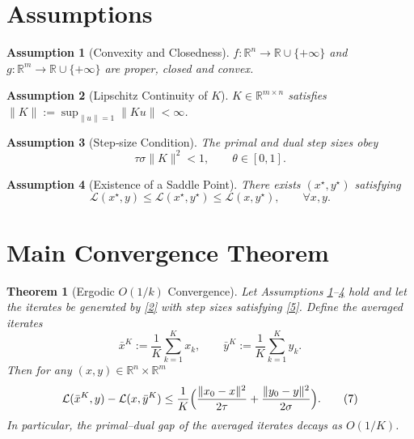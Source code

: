 \documentclass{article}
\newtheorem{theorem}{Theorem}
\newtheorem{assumption}{Assumption}
\newcommand{\norm}[1]{\|#1\|}
\begin{document}
\section*{Assumptions}
\begin{assumption}[Convexity and Closedness]\label{ass:convex}
$f:\mathbb{R}^{n}\to\mathbb{R}\cup\{+\infty\}$ and $g:\mathbb{R}^{m}\to\mathbb{R}\cup\{+\infty\}$ are proper, closed and convex.
\end{assumption}
\begin{assumption}[Lipschitz Continuity of $K$]\label{ass:K}
$K\in\mathbb{R}^{m\times n}$ satisfies $\|K\|:=\sup_{\|u\|=1}\|Ku\|<\infty$.
\end{assumption}
\begin{assumption}[Step‑size Condition]\label{ass:steps}
The primal and dual step sizes obey
\[
\tau\sigma\|K\|^{2}<1,\qquad \theta\in[0,1].
\tag{5}
\]
\end{assumption}
\begin{assumption}[Existence of a Saddle Point]\label{ass:saddle}
There exists $(x^{\star},y^{\star})$ satisfying
\[
\mathcal{L}(x^{\star},y)\le \mathcal{L}(x^{\star},y^{\star})\le \mathcal{L}(x,y^{\star}),\qquad\forall x,y.
\tag{6}
\]
\end{assumption}

\section*{Main Convergence Theorem}
\begin{theorem}[Ergodic $O(1/k)$ Convergence]\label{thm:ergodic}
Let Assumptions \ref{ass:convex}–\ref{ass:saddle} hold and let the iterates be generated by \eqref{2} with step sizes satisfying \eqref{5}. Define the averaged iterates
\[
\bar x^{K}:=\frac{1}{K}\sum_{k=1}^{K}x_{k},\qquad 
\bar y^{K}:=\frac{1}{K}\sum_{k=1}^{K}y_{k}.
\]
Then for any $(x,y)\in\mathbb{R}^{n}\times\mathbb{R}^{m}$
\[
\mathcal{L}(\bar x^{K},y)-\mathcal{L}(x,\bar y^{K})
\le \frac{1}{K}\Bigl(
\frac{\norm{x_{0}-x}^{2}}{2\tau}
+\frac{\norm{y_{0}-y}^{2}}{2\sigma}
\Bigr).
\tag{7}
\]
In particular, the primal–dual gap of the averaged iterates decays as $O(1/K)$. 
\end{theorem}
\end{document}
